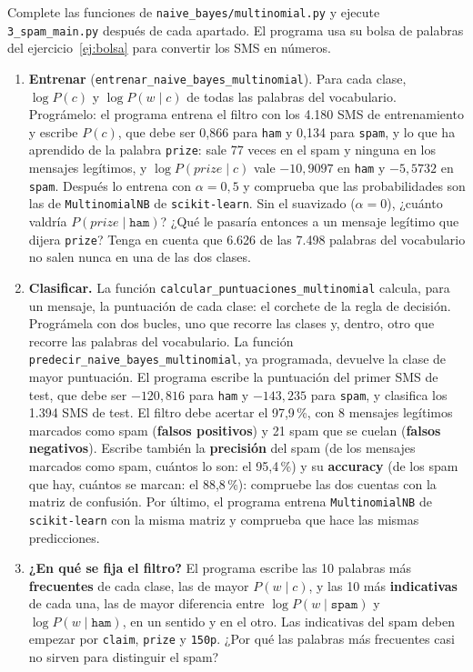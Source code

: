 \documentclass{article}
\begin{document}
\begin{exercise}[breakable]\label{ej:spam}
Complete las funciones de \texttt{naive\_bayes/multinomial.py} y ejecute \texttt{3\_spam\_main.py} después de cada apartado. El programa usa su bolsa de palabras del ejercicio~\ref{ej:bolsa} para convertir los SMS en números.
\begin{enumerate}
    \item[a)] \textbf{Entrenar} (\texttt{entrenar\_naive\_bayes\_multinomial}). Para cada clase, $\log P(c)$ y $\log P(w \mid c)$ de todas las palabras del vocabulario. Prográmelo: el programa entrena el filtro con los 4.180 SMS de entrenamiento y escribe $P(c)$, que debe ser 0,866 para \texttt{ham} y 0,134 para \texttt{spam}, y lo que ha aprendido de la palabra \texttt{prize}: sale 77 veces en el spam y ninguna en los mensajes legítimos, y $\log P(\textit{prize} \mid c)$ vale $-10{,}9097$ en \texttt{ham} y $-5{,}5732$ en \texttt{spam}. Después lo entrena con $\alpha = 0{,}5$ y comprueba que las probabilidades son las de \texttt{MultinomialNB} de \texttt{scikit-learn}. Sin el suavizado ($\alpha = 0$), ¿cuánto valdría $P(\textit{prize} \mid \texttt{ham})$? ¿Qué le pasaría entonces a un mensaje legítimo que dijera \texttt{prize}? Tenga en cuenta que 6.626 de las 7.498 palabras del vocabulario no salen nunca en una de las dos clases.
    \item[b)] \textbf{Clasificar.} La función \texttt{calcular\_puntuaciones\_multinomial} calcula, para un mensaje, la puntuación de cada clase: el corchete de la regla de decisión. Prográmela con dos bucles, uno que recorre las clases y, dentro, otro que recorre las palabras del vocabulario. La función \texttt{predecir\_naive\_bayes\_multinomial}, ya programada, devuelve la clase de mayor puntuación. El programa escribe la puntuación del primer SMS de test, que debe ser $-120{,}816$ para \texttt{ham} y $-143{,}235$ para \texttt{spam}, y clasifica los 1.394 SMS de test. El filtro debe acertar el 97,9\,\%, con 8 mensajes legítimos marcados como spam (\textbf{falsos positivos}) y 21 spam que se cuelan (\textbf{falsos negativos}). Escribe también la \textbf{precisión} del spam (de los mensajes marcados como spam, cuántos lo son: el 95,4\,\%) y su \textbf{accuracy} (de los spam que hay, cuántos se marcan: el 88,8\,\%): compruebe las dos cuentas con la matriz de confusión. Por último, el programa entrena \texttt{MultinomialNB} de \texttt{scikit-learn} con la misma matriz y comprueba que hace las mismas predicciones.
    \item[c)] \textbf{¿En qué se fija el filtro?} El programa escribe las 10 palabras más \textbf{frecuentes} de cada clase, las de mayor $P(w \mid c)$, y las 10 más \textbf{indicativas} de cada una, las de mayor diferencia entre $\log P(w \mid \texttt{spam})$ y $\log P(w \mid \texttt{ham})$, en un sentido y en el otro. Las indicativas del spam deben empezar por \texttt{claim}, \texttt{prize} y \texttt{150p}. ¿Por qué las palabras más frecuentes casi no sirven para distinguir el spam?

\end{enumerate}
\end{exercise}
\end{document}
